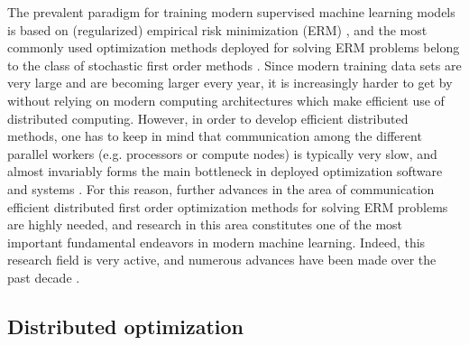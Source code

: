 \documentclass[12pt]{article}
\begin{document}
	The prevalent paradigm for training modern supervised machine learning models is based on (regularized) empirical risk minimization (ERM) \citep{shai_book}, and the most commonly used optimization methods deployed for solving ERM problems belong to the class of  stochastic first order methods \citep{RobbinsMonro:1951,  Nemirovski-Juditsky-Lan-Shapiro-2009}. Since modern training data sets are very large and are becoming larger every year, it is increasingly harder to get by without relying on modern computing architectures which make efficient use of  distributed computing.  However, in order to develop efficient distributed methods, one has to keep in mind that communication among the different parallel workers (e.g. processors or compute nodes) is typically very slow, and almost invariably forms the main bottleneck in deployed optimization software and systems \citep{bekkerman2011scaling}. For this reason, further advances in the area of communication efficient distributed first order optimization methods for solving ERM problems are highly needed, and research in this area constitutes one  of the most important fundamental endeavors in modern machine learning. Indeed, this research  field is very active, and numerous advances  have been made over the past decade \citep{Seide14, Wen17, Alistarh17, Bernstein18, DIANA, Stich19, Tang19}.
 
  \subsection{Distributed optimization}
 
\end{document}
